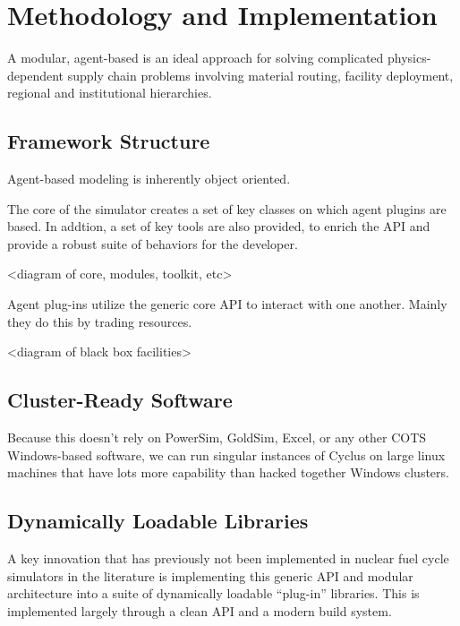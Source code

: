 \section{Methodology and Implementation}

A modular, agent-based is an ideal approach for solving complicated
physics-dependent supply chain problems involving material routing, facility
deployment, regional and institutional hierarchies.

\subsection{Framework Structure}

Agent-based modeling is inherently object oriented. 

The core of the simulator creates a set of key classes on which agent plugins 
are based. In addtion, a set of key tools are also provided, to enrich the API 
and provide a robust suite of behaviors for the developer.

<diagram of core, modules, toolkit, etc>

Agent plug-ins utilize the generic core API to interact with one another. 
Mainly they do this by trading resources. 

<diagram of black box facilities>

\subsection{Cluster-Ready Software}

Because this doesn't rely on PowerSim, GoldSim, Excel, or any other COTS 
Windows-based software, we can run singular instances of Cyclus 
on large linux machines that have lots more capability than hacked together 
Windows clusters. 

\subsection{Dynamically Loadable Libraries}

A key innovation that has previously not been implemented in nuclear fuel cycle 
simulators in the literature is implementing this generic API and modular 
architecture into a suite of dynamically loadable ``plug-in'' libraries. 
This is implemented largely through a clean API and a modern build system.

